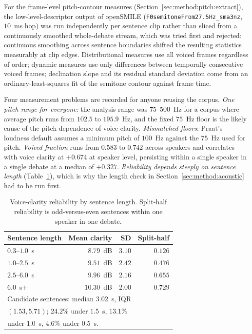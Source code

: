 \documentclass[journal]{IEEEtran}
\begin{document}
For the frame-level pitch-contour measures (Section~\ref{sec:method:pitch:extract}),
the low-level-descriptor output of openSMILE
(\texttt{F0semitoneFrom27.5Hz\_sma3nz}, $10$~ms hop) was run independently
per sentence clip rather than sliced from a continuously smoothed
whole-debate stream, which was tried first and rejected: continuous
smoothing across sentence boundaries shifted the resulting statistics
measurably at clip edges. Distributional measures use all voiced frames
regardless of order; dynamic measures use only differences between
temporally consecutive voiced frames; declination slope and its residual
standard deviation come from an ordinary-least-squares fit of the semitone
contour against frame time.

Four measurement problems are recorded for anyone reusing the corpus.
\emph{One pitch range for everyone}: the analysis range was $75$--$500$~Hz
for a corpus where average pitch runs from $102.5$ to $195.9$~Hz, and the
fixed $75$~Hz floor is the likely cause of the pitch-dependence of voice
clarity. \emph{Mismatched floors}: Praat's loudness default assumes a
minimum pitch of $100$~Hz against the $75$~Hz used for pitch. \emph{Voiced
fraction} runs from $0.583$ to $0.742$ across speakers and correlates with
voice clarity at $+0.674$ at speaker level, persisting within a single
speaker in a single debate at a median of $+0.327$. \emph{Reliability
depends steeply on sentence length} (Table~\ref{tab:reliab}), which is why
the length check in Section~\ref{sec:method:acoustic} had to be run first.

\begin{table}[h]
\caption{Voice-clarity reliability by sentence length. Split-half reliability
is odd-versus-even sentences within one speaker in one debate.}
\label{tab:reliab}
\centering
\begin{tabular}{lrrr}
\toprule
Sentence length & Mean clarity & SD & Split-half \\
\midrule
$0.3$--$1.0$~s  & $8.79$~dB  & $3.10$ & $0.126$ \\
$1.0$--$2.5$~s  & $9.51$~dB  & $2.42$ & $0.476$ \\
$2.5$--$6.0$~s  & $9.96$~dB  & $2.16$ & $0.655$ \\
$6.0$~s$+$      & $10.30$~dB & $2.00$ & $0.729$ \\
\midrule
\multicolumn{4}{l}{Candidate sentences: median $3.02$~s, IQR} \\
\multicolumn{4}{l}{$(1.53, 5.71)$; $24.2\%$ under $1.5$~s, $13.1\%$} \\
\multicolumn{4}{l}{under $1.0$~s, $4.6\%$ under $0.5$~s.} \\
\bottomrule
\end{tabular}
\end{table}
\end{document}
